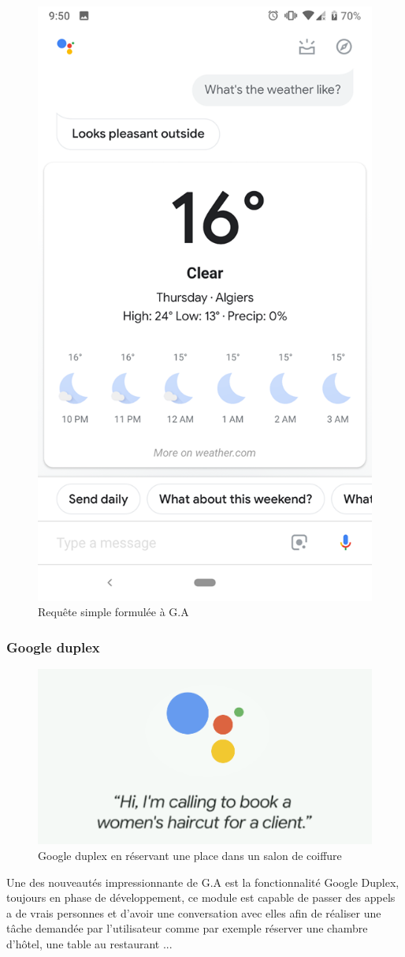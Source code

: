 \begin{figure}[H]
	\centering
	\includegraphics[width=.5\linewidth]{images/google_assitant/weather.png} 
	\caption{Requête simple formulée à G.A} 
	
\end{figure} 


\subsubsection*{Google duplex}\label{duplex}
\begin{figure}[H]
	\centering
	\includegraphics[width=.5\linewidth]{images/google_assitant/duplex.png} 
	\caption{Google duplex en réservant une place dans un salon de coiffure} 
\end{figure}
\par Une des nouveautés impressionnante de G.A est la fonctionnalité Google Duplex, toujours en phase de développement, ce module est capable de passer des appels a de vrais personnes et d'avoir une conversation avec elles afin de réaliser une tâche demandée par l'utilisateur comme par exemple réserver une chambre d'hôtel, une table au restaurant ... 



